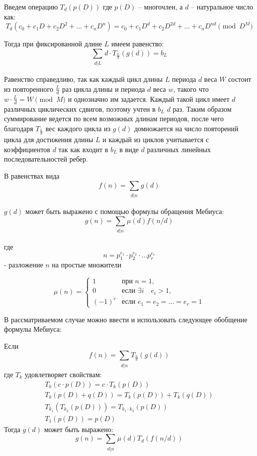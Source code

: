 \begin{definition} \label{def1}
Введем операцию $T_d(p(D))$ где $p(D)$ -- многочлен, а $d$ -- натуральное число как:
\[
  T_d(c_0+c_1D+c_2D^2+...+c_nD^n) = c_0+c_1D^{d}+c_2D^{2d}+...+c_nD^{nd} \pmod{D^M}
\]
\end{definition}

Тогда при фиксированной длине $L$ имеем равенство:
\[
  \sum_{\substack{d | L}}d \cdot T_{\frac{L}{d}}(g(d)) = b_L \label{eqWithT}
\]

Равенство справедливо, так как каждый цикл длины $L$ периода $d$ веса $W$ состоит из повторенного $\frac{L}{d}$ раз
цикла длины и периода $d$ веса $w$, такого что $w\cdot \frac{L}{d} = W \pmod M$ и однозначно им задается.
Каждый такой цикл имеет $d$ различных циклических сдвигов, поэтому учтен в $b_L$ $d$ раз.
Таким образом суммирование ведется по всем возможных длинам периодов, после чего благодаря $T_{\frac{L}{d}}$
вес каждого цикла из $g(d)$ домножается на число повторений цикла для достижения длины $L$ и каждый
из циклов учитывается с коэффициентов $d$ так как входит в $b_L$ в виде $d$ различных линейных 
последовательностей ребер.

В равенствах вида
\[
  f(n)=\sum_{\substack{d|n}}g(d)
\]

$g(d)$ может быть выражено с помощью формулы обращения Мебиуса:
\[
  g(n) = \sum_{\substack{d|n}}\mu(d)f(n/d)
\]

где\[
  n = p_1^{e_1} \cdot p_2^{e_2} \cdot \ldots p_r^{e_r}
\]
- разложение $n$ на простые множители

\[
  \mu(n)=
\left\{
  \begin{array}{lll}
    1 & \mbox{при } n=1, \\
    0 & \mbox{если } \exists i \quad e_i > 1, \\
    (-1)^r & \mbox{если } e_1 = e_2 = \ldots = e_r = 1
  \end{array}
\right.
\]

В рассматриваемом случае можно ввести и использовать следующее обобщение формулы Мебиуса:

\begin{theorem} \label{th1}
Если
\[
  f(n) = \sum_{\substack{d|n}}T_{\frac{n}{d}}(g(d))
\]
где $T_{k}$ удовлетворяет свойствам:
\begin{eqnarray}
T_k(c \cdot p(D)) = c \cdot T_k(p(D)) \label{eq1}\\
T_k(p(D)+q(D)) = T_k(p(D))+T_k(q(D))\label{eq2}\\
T_{k_1}(T_{k_2}(p(D))) = T_{k_1\cdot k_2}(p(D)) \label{eq3}\\
T_1(p(D)) = p(D) \label{eq4}\
\end{eqnarray}
Тогда $g(d)$ может быть выражено:
\[
  g(n) = \sum_{\substack{d|n}}\mu(d)T_d(f(n/d))
\]
\end{theorem}

